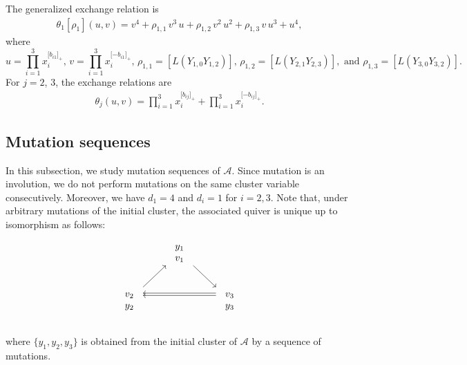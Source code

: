 \documentclass[11pt, reqno]{amsart}
\theoremstyle{plain}
\theoremstyle{definition}
\numberwithin{equation}{section}
\begin{document}
The generalized exchange relation is 
\begin{align}\label{Eq:A_3 generalized exchange relation}
\theta_1[\rho_{1}](u,v)= v^4 + \rho_{1,1}\, v^3 \,u + \rho_{1,2}\,v^2\, u^2 + \rho_{1,3}\, v\, u^3 + u^4,
\end{align}
where 
\[
u= \displaystyle \prod_{i=1}^3 x_i^{\lbrack b_{i1}\rbrack_+},\,v= \displaystyle \prod_{i=1}^3 x_i^{\lbrack -b_{i1}\rbrack_+},\,\rho_{1,1}=[L(Y_{1,0}Y_{1,2})], \, \rho_{1,2}=[L(Y_{2,1}Y_{2,3})], \text{ and }\rho_{1,3}=[L(Y_{3,0}Y_{3,2})].
\]
For $j=2$, $3$, the exchange relations are
\begin{align}\label{Eq:A_3 exchange relation 1}
\theta_j(u,v)=\displaystyle \prod_{i=1}^3 x_i^{\lbrack b_{ij}\rbrack_+} + \prod_{i=1}^3 x_i^{\lbrack -b_{ij}\rbrack_+}.
\end{align}
 
\subsection{\texorpdfstring{Mutation sequences}{Mutation sequence}}\label{sub: mutation sequence of A_3} In this subsection, we study mutation sequences of $\mathcal{A}$. Since mutation is an involution, we do not perform mutations on the same cluster variable consecutively. Moreover, we have $d_1=4$ and $d_i=1$ for $i=2,3$. Note that, under arbitrary mutations of the initial cluster, the associated quiver is unique up to isomorphism as follows:
\[\begin{tikzcd}
	& \begin{array}{c} y_1\\v_1 \end{array} \\
	\begin{array}{c} v_2\\y_2 \end{array} && \begin{array}{c} v_3\\y_3 \end{array}
	\arrow[from=1-2, to=2-3]
	\arrow[from=2-1, to=1-2]
	\arrow[shift right=3, from=2-3, to=2-1]
	\arrow[shift right=2, from=2-3, to=2-1]
\end{tikzcd}\]\\
where $\{y_1,y_2,y_3\}$ is obtained from the initial cluster of $\mathcal{A}$ by a sequence of mutations.
\end{document}
